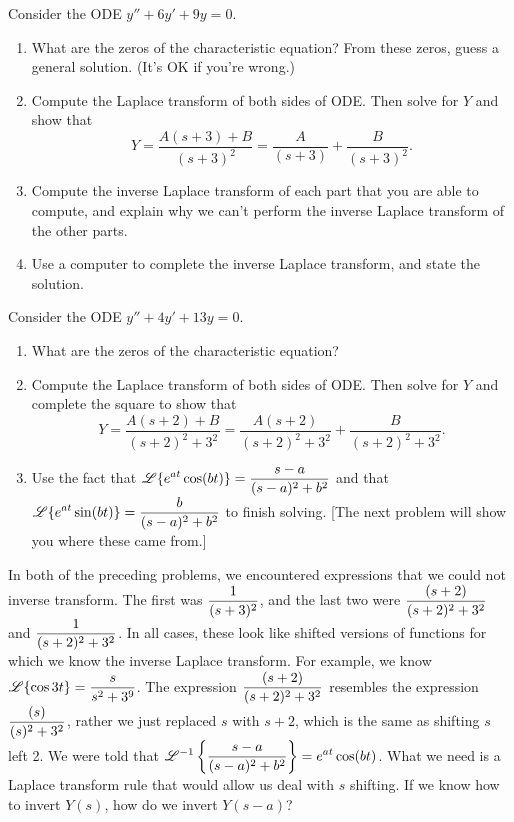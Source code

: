 \begin{problem}
 Consider the ODE $y''+6y'+9y=0$.  
\begin{enumerate}
 \item What are the zeros of the characteristic equation? From these zeros, guess a general solution. (It's OK if you're wrong.)
 \item Compute the Laplace transform of both sides of ODE. Then solve for $Y$ and show that 
$$Y = \frac{A(s+3)+B}{(s+3)^2} =  \frac{A}{(s+3)}+\frac{B}{(s+3)^2}. $$
 \item Compute the inverse Laplace transform of each part that you are able to compute, and explain why we can't perform the inverse Laplace transform of the other parts. 
 \item Use a computer to complete the inverse Laplace transform, and state the solution.
\end{enumerate}
\end{problem}

\begin{problem}
 Consider the ODE $y''+4y'+13y=0$.  
\begin{enumerate}
 \item What are the zeros of the characteristic equation?
 \item Compute the Laplace transform of both sides of ODE. Then solve for $Y$ and complete the square to show that 
$$Y = \frac{A(s+2)+B}{(s+2)^2+3^2} = \frac{A(s+2)}{(s+2)^2+3^2} +  \frac{B}{(s+2)^2+3^2}. $$
 \item Use the fact that $\displaystyle \mathscr{L}\{e^{at}\cos(bt)\} = \frac{s-a}{(s-a)^2+b^2}$ and that $\displaystyle \mathscr{L}\{e^{at}\sin(bt)\} = \frac{b}{(s-a)^2+b^2}$ to finish solving. [The next problem will show you where these came from.] 
\end{enumerate}
\end{problem}

In both of the preceding problems, we encountered expressions that we could not inverse transform. The first was $\displaystyle\frac{1}{(s+3)^2}$, and the last two were $\displaystyle\frac{(s+2)}{(s+2)^2+3^2}$ and $\displaystyle\frac{1}{(s+2)^2+3^2}$. In all cases, these look like shifted versions of functions for which we know the inverse Laplace transform.  For example, we know $\displaystyle \mathscr{L}\{\cos 3t\} = \frac{s}{s^2+3^9}$.  The expression $\displaystyle\frac{(s+2)}{(s+2)^2+3^2}$ resembles the expression $\displaystyle\frac{(s)}{(s)^2+3^2}$, rather we just replaced $s$ with $s+2$, which is the same as shifting $s$ left 2. We were told that $\displaystyle \mathscr{L}^{-1}\left\{\frac{s-a}{(s-a)^2+b^2}\right\} = e^{at}\cos(bt)$. What we need is a Laplace transform rule that would allow us deal with $s$ shifting. If we know how to invert $Y(s)$, how do we invert $Y(s-a)$?

